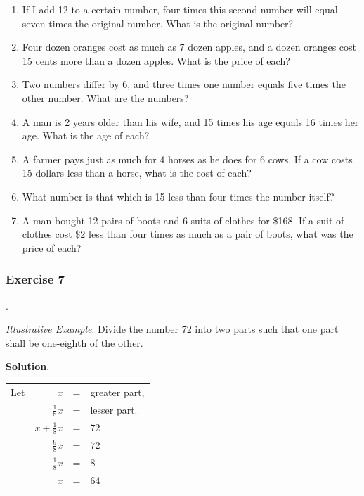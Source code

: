 \documentclass{book}
\begin{document}
\begin{enumerate}
\item If I add 12 to a certain number, four times this second
number will equal seven times the original number. What is the
original number?

\item Four dozen oranges cost as much as 7 dozen apples, and a
dozen oranges cost 15 cents more than a dozen apples. What is the
price of each?

\item Two numbers differ by 6, and three times one number equals
five times the other number. What are the numbers?

\item A man is 2 years older than his wife, and 15 times his age
equals 16 times her age. What is the age of each?

\item A farmer pays just as much for 4 horses as he does for 6
cows. If a cow costs 15 dollars less than a horse, what is the
cost of each?

\item What number is that which is 15 less than four times the
number itself?

\item A man bought 12 pairs of boots and 6 suits of clothes for
\$168. If a suit of clothes cost \$2 less than four times as much
as a pair of boots, what was the price of each?
\end{enumerate}

\subsubsection*{Exercise 7}.

\textit{ Illustrative Example}. Divide the number 72 into two
parts such that one part shall be one-eighth of the other.
\begin{center}
\textbf{ Solution}.
\end{center}
\begin{center}
\begin{tabular}{l r c l}
Let & $x$ &=& greater part,\\
& $\frac{1}{8}x$ &=& lesser part.\\
& $x + \frac{1}{8}x$ &=& $72$\\
& $\frac{9}{8}x $&=& $72$\\
& $\frac{1}{8}x $&=& $8$\\
& $x$&=& $64$\\
\end{tabular}
\end{center}
\end{document}
